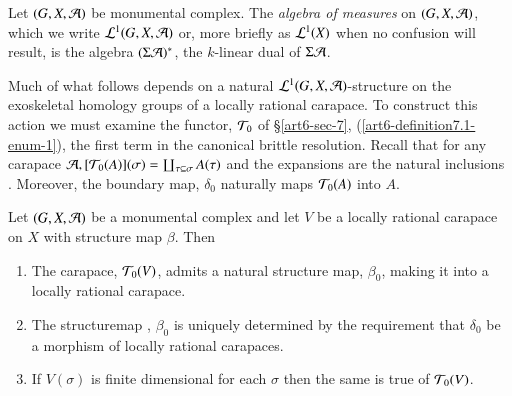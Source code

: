 \begin{definition}\label{art6-definition-13.4}
Let $(G, X, \mathcal{A})$ be monumental complex. The \textit{algebra of measures} on $(G, X, \mathcal{A})$, which we write $\mathcal{L}^{1}(G, X, \mathcal{A})$ or, more briefly as $\mathcal{L}^{1}(X)$ when no confusion will result, is the algebra $(\Sigma \mathcal{A})^{*}$, the $k$-linear dual of $\Sigma\mathcal{A}$. 
\end{definition}

 Much of what follows depends on a natural $\mathcal{L}^{1}(G, X, \mathcal{A})$-structure on the exoskeletal homology groups of a locally rational carapace. To construct this action we must examine the functor, $\mathcal{T}_{0}$ of \S \ref{art6-sec-7},
 (\ref{art6-definition7.1-enum-1}), the first term in the canonical brittle resolution. Recall that for any carapace $\mathcal{A}, [\mathcal{T}_{0}(A)](\sigma)= \coprod_{\tau \subseteq \sigma}A(\tau)$ and the expansions are the natural inclusions . Moreover, the boundary map, $\delta_{0}$ naturally maps $\mathcal{T}_{0}(A)$ into $A$.

\begin{prop}\label{art6-proposition-13.5}
Let $(G, X, \mathcal{A})$ be a monumental complex and let $V$ be a locally rational carapace on $X$ with structure map $\beta$. Then
\begin{enumerate}[(1)]
\item The carapace, $\mathcal{T}_{0}(V)$, admits a natural structure map, $\beta_{0}$, making it into a
locally rational carapace.\label{art6-proposition13.5-enum-1}

\item The structuremap , $\beta_{0}$ is uniquely determined by the requirement that $\delta_{0}$ be a morphism of locally rational carapaces.\label{art6-proposition13.5-enum-2}

\item If $V(\sigma)$ is finite dimensional for each $\sigma$ then the same is
 true of $\mathcal{T}_{0}(V)$.\label{art6-proposition13.5-enum-3}
\end{enumerate}
\end{prop}

